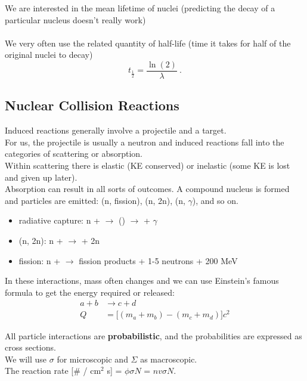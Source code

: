 \documentclass[12pt]{article}
\newif\ifeqns
\begin{document}
We are interested in the mean lifetime of nuclei (predicting the decay of a particular nucleus doesn't really work)\\
\ifeqns
\[\bar{t} \equiv \int_0^\infty dt \: t \: p(t) = \lambda \int_0^\infty dt \: t \: e^{-\lambda t} = \frac{1}{\lambda} \:. \]
\else
\vspace*{2em}\\
\fi
We very often use the related quantity of half-life (time it takes for half of the original nuclei to decay) 
\[t_{\frac{1}{2}} = \frac{\ln(2)}{\lambda} \:. \]

\subsection*{Nuclear Collision Reactions}
Induced reactions generally involve a projectile and a target. \\
For us, the projectile is usually a neutron and induced reactions fall into the categories of scattering or absorption.\\
Within scattering there is elastic (KE conserved) or inelastic (some KE is lost and given up later).\\
Absorption can result in all sorts of outcomes. 
A compound nucleus is formed and particles are emitted: (n, fission), (n, 2n), (n, $\gamma$), and so on.
%
\begin{itemize}
\item radiative capture: n +  $\rightarrow$ () $\rightarrow$  + $\gamma$
\item (n, 2n): n +  $\rightarrow$  + 2n
\item fission: n +  $\rightarrow$ fission products + 1-5 neutrons + 200 MeV
\end{itemize}

In these interactions, mass often changes and we can use Einstein's famous formula to get the energy required or released:
\begin{align*}
a + b &\rightarrow c + d\\
Q &= \bigl[ (m_a + m_b) - (m_c + m_d) \bigr]c^2
\end{align*}

All particle interactions are \textbf{probabilistic}, and the probabilities are expressed as cross sections. \\
We will use $\sigma$ for microscopic and $\Sigma$ as macroscopic.\\
The reaction rate [\# / cm$^2$ s] = $\phi \sigma N$ = $nv \sigma N$.
\end{document}
